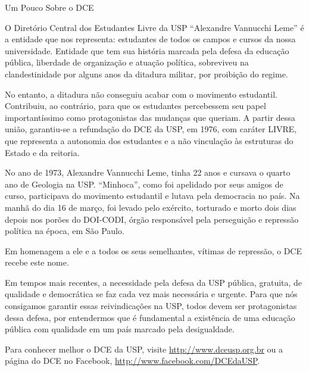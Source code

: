 \begin{secao}{Um Pouco Sobre o DCE}

O Diretório Central dos Estudantes Livre da USP ``Alexandre Vannucchi Leme'' é a
entidade que nos representa: estudantes de todos os campos e cursos da nossa universidade.
Entidade que tem sua história marcada pela defesa da educação pública, liberdade
de organização e atuação política, sobreviveu na clandestinidade por alguns anos
da ditadura militar, por proibição do regime.

No entanto, a ditadura não conseguiu acabar com o movimento estudantil. Contribuiu,
ao contrário, para que os estudantes percebessem seu papel importantíssimo como
protagonistas das mudanças que queriam. A partir dessa união, garantiu-se a
refundação do DCE da USP, em 1976, com caráter LIVRE, que representa a autonomia
dos estudantes e a não vinculação às estruturas do Estado e da reitoria.

No ano de 1973, Alexandre Vannucchi Leme, tinha 22 anos e cursava o quarto ano
de Geologia na USP. ``Minhoca'', como foi apelidado por seus amigos de curso, participava
do movimento estudantil e lutava pela democracia no país. Na manhã do dia 16 de março,
foi levado pelo exército, torturado e morto dois dias depois nos porões do DOI-CODI,
órgão responsável pela perseguição e repressão política na época, em São Paulo.

Em homenagem a ele e a todos os seus semelhantes, vítimas de repressão, o DCE recebe este nome.

Em tempos mais recentes, a necessidade pela defesa da USP pública, gratuita, de qualidade
e democrática se faz cada vez mais necessária e urgente. Para que nós consigamos
garantir essas reivindicações na USP, todos devem ser protagonistas dessa defesa,
por entendermos que é fundamental a existência de uma educação pública com qualidade
em um país marcado pela desigualdade.

Para conhecer melhor o DCE da USP, visite \url{http://www.dceusp.org.br} ou a página do DCE no Facebook,
\url{http://www.facebook.com/DCEdaUSP}.

\end{secao}

